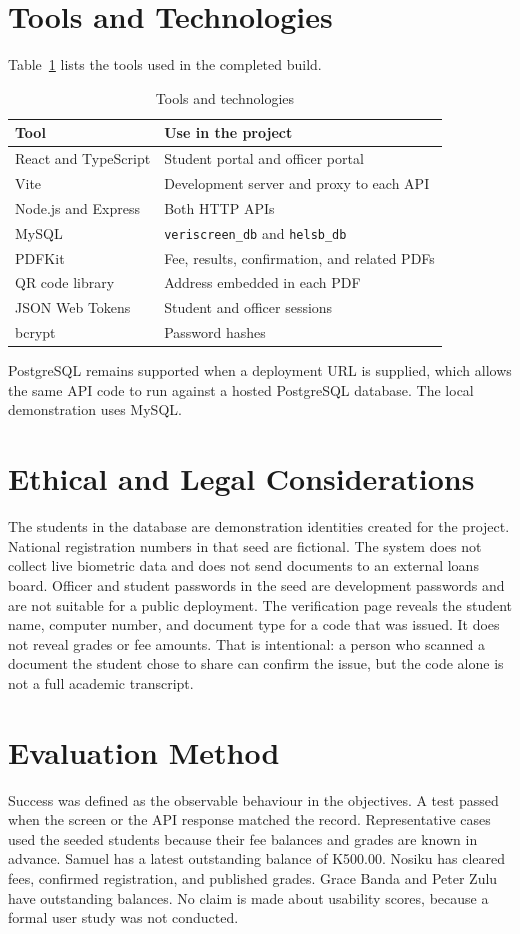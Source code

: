 \documentclass[12pt,a4paper]{report}
\begin{document}
\section{Tools and Technologies}
Table~\ref{tab:tools} lists the tools used in the completed build.

\begin{table}[H]
\centering
\caption{Tools and technologies}
\label{tab:tools}
\begin{tabular}{p{}p{}}
\toprule
Tool & Use in the project\\
\midrule
React and TypeScript & Student portal and officer portal\\
Vite & Development server and proxy to each API\\
Node.js and Express & Both HTTP APIs\\
MySQL & \texttt{veriscreen\_db} and \texttt{helsb\_db}\\
PDFKit & Fee, results, confirmation, and related PDFs\\
QR code library & Address embedded in each PDF\\
JSON Web Tokens & Student and officer sessions\\
bcrypt & Password hashes\\
\bottomrule
\end{tabular}
\end{table}

PostgreSQL remains supported when a deployment URL is supplied, which allows the same API code to run against a hosted PostgreSQL database. The local demonstration uses MySQL.

\section{Ethical and Legal Considerations}
The students in the database are demonstration identities created for the project. National registration numbers in that seed are fictional. The system does not collect live biometric data and does not send documents to an external loans board. Officer and student passwords in the seed are development passwords and are not suitable for a public deployment. The verification page reveals the student name, computer number, and document type for a code that was issued. It does not reveal grades or fee amounts. That is intentional: a person who scanned a document the student chose to share can confirm the issue, but the code alone is not a full academic transcript.

\section{Evaluation Method}
Success was defined as the observable behaviour in the objectives. A test passed when the screen or the API response matched the record. Representative cases used the seeded students because their fee balances and grades are known in advance. Samuel has a latest outstanding balance of K500.00. Nosiku has cleared fees, confirmed registration, and published grades. Grace Banda and Peter Zulu have outstanding balances. No claim is made about usability scores, because a formal user study was not conducted.
\end{document}
